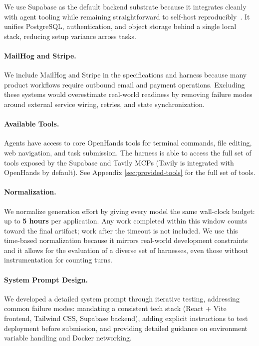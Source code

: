 We use Supabase as the default backend substrate because it integrates cleanly with agent tooling while remaining straightforward to self-host reproducibly~\cite{supabase2024}. It unifies PostgreSQL, authentication, and object storage behind a single local stack, reducing setup variance across tasks.

\paragraph{MailHog and Stripe.}
We include MailHog and Stripe in the specifications and harness because many product workflows require outbound email and payment operations. Excluding these systems would overestimate real-world readiness by removing failure modes around external service wiring, retries, and state synchronization.

\paragraph{Available Tools.}
Agents have access to core OpenHands tools for terminal commands, file editing, web navigation, and task submission. The harness is able to access the full set of tools exposed by the Supabase and Tavily MCPs (Tavily is integrated with OpenHands by default). See Appendix \ref{sec:provided-tools} for the full set of tools.

\paragraph{Normalization.}
We normalize generation effort by giving every model the same wall-clock budget: up to \textbf{5 hours} per application. Any work completed within this window counts toward the final artifact; work after the timeout is not included. We use this time-based normalization because it mirrors real-world development constraints and it allows for the evaluation of a diverse set of harnesses, even those without instrumentation for counting turns.

\paragraph{System Prompt Design.}
We developed a detailed system prompt through iterative testing, addressing common failure modes: mandating a consistent tech stack (React + Vite frontend, Tailwind CSS, Supabase backend), adding explicit instructions to test deployment before submission, and providing detailed guidance on environment variable handling and Docker networking.

